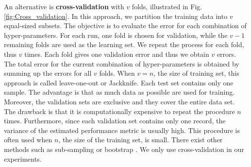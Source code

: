 An alternative is \textbf{cross-validation} with $v$ folds, illustrated in Fig. \ref{fig:Cross_validation}. In this approach, we partition the training data into $v$ equal-sized subsets. The objective is to evaluate the error for each combination of hyper-parameters. For each run, one fold is chosen for validation, while the $v-1$ remaining folds are used as the learning set. We repeat the process for each fold, thus $v$ times. Each fold gives one validation error and thus we obtain $v$ errors. The total error for the current combination of hyper-parameters is obtained by summing up the errors for all $v$ folds. When $v=n$, the size of training set, this approach is called leave-one-out or Jackknife. Each test set contains only one sample. The advantage is that as much data as possible are used for training. Moreover, the validation sets are exclusive and they cover the entire data set. The drawback is that it is computationally expensive to repeat the procedure $n$ times. Furthermore, since each validation set contains only one record, the variance of the estimated performance metric is usually high. This procedure is often used when $n$, the size of the training set, is small. There exist other methods such as sub-sampling or bootstrap \cite{Duda1973,Dreyfus2006}. We only use cross-validation in our experiments.

